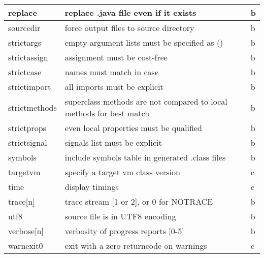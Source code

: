 \begin{longtable}[l]{|l|p{10cm}|l|}
\hline
 replace      & replace .java file even if it exists &b \\
\hline
 sourcedir    & force output files to source directory &b \\
\hline
 strictargs   & empty argument lists must be specified as () &b \\
\hline
 strictassign & assignment must be cost-free &b \\
\hline
 strictcase   & names must match in case &b \\
\hline
 strictimport & all imports must be explicit &b \\
\hline
 strictmethods & superclass methods are not compared to local methods for best match &b \\
\hline
 strictprops  & even local properties must be qualified &b \\
\hline
 strictsignal & signals list must be explicit &b \\
\hline
 symbols      & include symbols table in generated .class files &b \\
\hline
 targetvm     & specify a target vm class version &c \\
\hline
 time         & display timings &c \\
\hline
 trace[n]     & trace stream [1 or 2], or 0 for NOTRACE &b \\
\hline
 utf8         & source file is in UTF8 encoding &b \\
\hline
 verbose[n]   & verbosity of progress reports [0-5] &b \\
\hline
 warnexit0    & exit with a zero returncode on warnings &c \\
\hline
\end{longtable}

